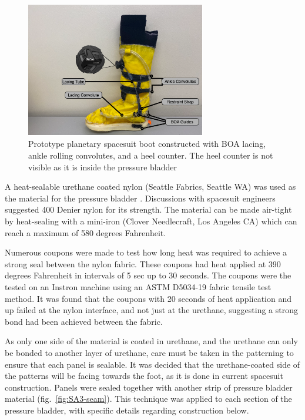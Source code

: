 \documentclass[defaultstyle,11pt]{thesis}
\begin{document}
\begin{figure}
\hypertarget{fig:SA3-proto_boot}{%
\centering
\includegraphics[width=0.7\textwidth,height=\textheight]{../fig/SA3/Proto_Spaceboot.png}
\caption{Prototype planetary spacesuit boot constructed with BOA lacing, ankle rolling convolutes, and a heel counter. The heel counter is not visible as it is inside the pressure bladder}\label{fig:SA3-proto_boot}
}
\end{figure}

A heat-sealable urethane coated nylon (Seattle Fabrics, Seattle WA) was used as the material for the pressure bladder \citep{Harris2001}.
Discussions with spacesuit engineers suggested 400 Denier nylon for its strength. The material can be made air-tight by heat-sealing with a mini-iron (Clover Needlecraft, Los Angeles CA) which can reach a maximum of 580 degrees Fahrenheit.

Numerous coupons were made to test how long heat was required to achieve a strong seal between the nylon fabric.
These coupons had heat applied at 390 degrees Fahrenheit in intervals of 5 sec up to 30 seconds.
The coupons were the tested on an Instron machine using an ASTM D5034-19 fabric tensile test method.
It was found that the coupons with 20 seconds of heat application and up failed at the nylon interface, and not just at the urethane, suggesting a strong bond had been achieved between the fabric.

As only one side of the material is coated in urethane, and the urethane can only be bonded to another layer of urethane, care must be taken in the patterning to ensure that each panel is sealable.
It was decided that the urethane-coated side of the patterns will be facing towards the foot, as it is done in current spacesuit construction.
Panels were sealed together with another strip of pressure bladder material (fig.~\ref{fig:SA3-seam}).
This technique was applied to each section of the pressure bladder, with specific details regarding construction below.
\end{document}
